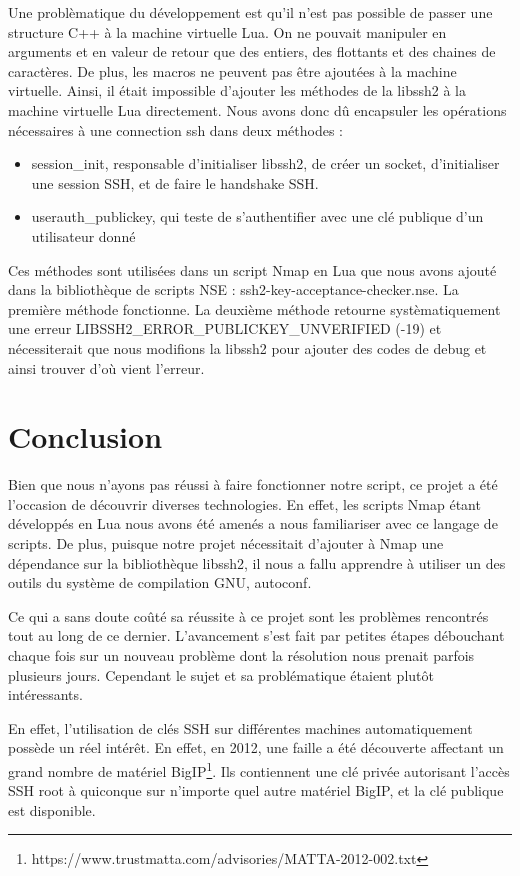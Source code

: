 \documentclass[frenchb]{article}
\begin{document}
Une probl\`ematique du d\'eveloppement est qu'il n'est pas possible de passer une structure C++ à la machine virtuelle Lua. On ne pouvait manipuler en arguments et en valeur de retour que des entiers, des flottants et des chaines de caract\`eres. De plus, les macros ne peuvent pas être ajout\'ees à la machine virtuelle. Ainsi, il \'etait impossible d'ajouter les m\'ethodes de la \textsf{libssh2} à la machine virtuelle Lua directement. Nous avons donc dû encapsuler les op\'erations n\'ecessaires à une connection ssh dans deux m\'ethodes :
\begin{itemize}
    \item \textsf{session\_init}, responsable d'initialiser \textsf{libssh2}, de cr\'eer un socket, d'initialiser une session SSH, et de faire le handshake SSH.
    \item \textsf{userauth\_publickey}, qui teste de s'authentifier avec une cl\'e publique d'un utilisateur donn\'e
\end{itemize}
Ces m\'ethodes sont utilis\'ees dans un script Nmap en Lua que nous avons ajout\'e dans la biblioth\`eque de scripts NSE : \textsf{ssh2-key-acceptance-checker.nse}. 
La premi\`ere m\'ethode fonctionne. La deuxi\`eme m\'ethode retourne syst\`ematiquement une erreur \textsf{LIBSSH2\_ERROR\_PUBLICKEY\_UNVERIFIED} (-19) et n\'ecessiterait que nous modifions la \textsf{libssh2} pour ajouter des codes de debug et ainsi trouver d'où vient l'erreur.

\clearpage
\section*{Conclusion}


Bien que nous n'ayons pas réussi à faire fonctionner notre script, ce projet a été l'occasion de découvrir diverses technologies. En effet, les scripts Nmap étant développés en Lua nous avons été amenés a nous familiariser avec ce langage de scripts. De plus, puisque notre projet nécessitait d'ajouter à Nmap une dépendance sur la bibliothèque \textsf{libssh2}, il nous a fallu apprendre à utiliser un des outils du système de compilation GNU, \textsf{autoconf}. 

Ce qui a sans doute coûté sa réussite à ce projet sont les problèmes rencontrés tout au long de ce dernier. L'avancement s'est fait par petites étapes débouchant chaque fois sur un nouveau problème dont la résolution nous prenait parfois plusieurs jours. Cependant le sujet et sa problématique étaient plutôt intéressants.

En effet, l'utilisation de clés SSH sur différentes machines automatiquement possède un réel intérêt. En effet, en 2012, une faille a été découverte affectant un grand nombre de matériel BigIP\footnote{https://www.trustmatta.com/advisories/MATTA-2012-002.txt}. Ils contiennent une clé privée autorisant l'accès SSH root à quiconque sur n'importe quel autre matériel BigIP, et la clé publique est disponible.
\end{document}
